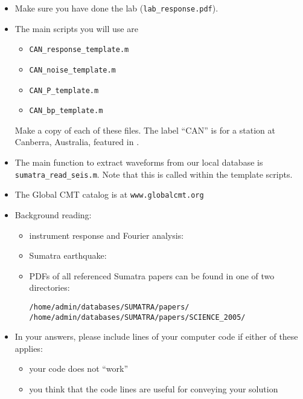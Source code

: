 \documentclass[11pt,titlepage,fleqn]{article}
\begin{document}
\begin{itemize}

\item Make sure you have done the lab (\verb+lab_response.pdf+).


\item The main scripts you will use are
%
\begin{itemize}
\item \verb+CAN_response_template.m+
\item \verb+CAN_noise_template.m+
\item \verb+CAN_P_template.m+
\item \verb+CAN_bp_template.m+
\end{itemize}
%
Make a copy of each of these files. The label ``CAN'' is for a station at Canberra, Australia, featured in \citet[][Figure~1]{Park2005}.


\item The main function to extract waveforms from our local database is \verb+sumatra_read_seis.m+. Note that this is called within the template scripts.


\item The Global CMT catalog is at \verb+www.globalcmt.org+


\item Background reading:

\begin{itemize}
\item instrument response and Fourier analysis: \citet[][Ch.~6]{SteinWysession}
\item Sumatra earthquake: \citep{Lay2005,Ammon2005,Park2005,Ni2005}
\item PDFs of all referenced Sumatra papers can be found in one of two directories:
%
\begin{verbatim}
/home/admin/databases/SUMATRA/papers/
/home/admin/databases/SUMATRA/papers/SCIENCE_2005/
\end{verbatim}

\end{itemize}


\item In your answers, please include lines of your computer code if either of these applies:
%
\begin{itemize}
\item your code does not ``work''
\item you think that the code lines are useful for conveying your solution
\end{itemize}

\end{itemize}
\end{document}
